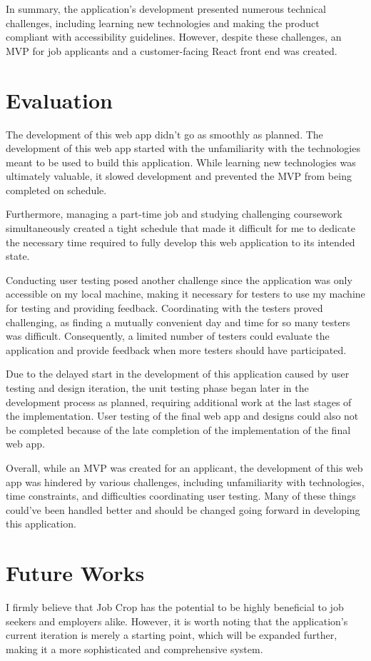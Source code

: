 In summary, the application's development presented numerous technical challenges, including learning new technologies and making the product compliant with accessibility guidelines. However, despite these challenges, an MVP for job applicants and a customer-facing React front end was created.

\newpage
\section{Evaluation}
The development of this web app didn't go as smoothly as planned. The development of this web app started with the unfamiliarity with the technologies meant to be used to build this application. While learning new technologies was ultimately valuable, it slowed development and prevented the MVP from being completed on schedule.

Furthermore, managing a part-time job and studying challenging coursework simultaneously created a tight schedule that made it difficult for me to dedicate the necessary time required to fully develop this web application to its intended state.

Conducting user testing posed another challenge since the application was only accessible on my local machine, making it necessary for testers to use my machine for testing and providing feedback. Coordinating with the testers proved challenging, as finding a mutually convenient day and time for so many testers was difficult. Consequently, a limited number of testers could evaluate the application and provide feedback when more testers should have participated.

Due to the delayed start in the development of this application caused by user testing and design iteration, the unit testing phase began later in the development process as planned, requiring additional work at the last stages of the implementation. User testing of the final web app and designs could also not be completed because of the late completion of the implementation of the final web app. 

Overall, while an MVP was created for an applicant, the development of this web app was hindered by various challenges, including unfamiliarity with technologies, time constraints, and difficulties coordinating user testing. Many of these things could've been handled better and should be changed going forward in developing this application.

\section{Future Works}
I firmly believe that Job Crop has the potential to be highly beneficial to job seekers and employers alike. However, it is worth noting that the application's current iteration is merely a starting point, which will be expanded further, making it a more sophisticated and comprehensive system.

